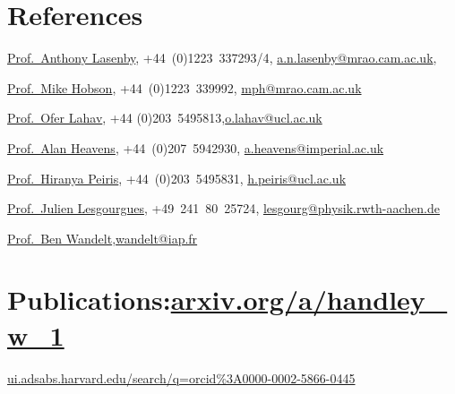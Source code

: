 \documentclass[11pt,a4paper,sans]{moderncv}
\begin{document}
\section{References}
\href{https://www.kicc.cam.ac.uk/directory/anl1000}{Prof.\ Anthony Lasenby}, {+44~(0)1223~337293/4}, \href{mailto:a.n.lasenby@mrao.cam.ac.uk}{a.n.lasenby@mrao.cam.ac.uk}, 

\href{https://www.phy.cam.ac.uk/directory/hobsonm}{Prof.\ Mike Hobson}, {+44~(0)1223~339992}, \href{mailto:mph@mrao.cam.ac.uk}{mph@mrao.cam.ac.uk} 


\href{https://www.ucl.ac.uk/astrophysics/professor-ofer-lahav}{Prof.\ Ofer Lahav}, {+44 (0)203~5495813},\href{mailto:o.lahav@ucl.ac.uk}{o.lahav@ucl.ac.uk} 

\href{https://www.imperial.ac.uk/people/a.heavens}{Prof.\ Alan Heavens}, {+44~(0)207~5942930}, \href{mailto:a.heavens@imperial.ac.uk}{a.heavens@imperial.ac.uk} 


\href{https://www.ucl.ac.uk/cosmoparticle/hiranya-peiris}{Prof.\ Hiranya Peiris}, {+44~(0)203~5495831}, \href{mailto:h.peiris@ucl.ac.uk}{h.peiris@ucl.ac.uk} 

\href{https://www.particle-theory.rwth-aachen.de/go/id/gufe/lidx/1}{Prof.\ Julien Lesgourgues}, {+49~241~80~25724}, \href{mailto:lesgourg@physik.rwth-aachen.de}{lesgourg@physik.rwth-aachen.de} 

\href{https://benwandelt.org/}{Prof.\ Ben Wandelt},\href{mailto:wandelt@iap.fr}{wandelt@iap.fr} 

\pagebreak
\section{Publications:\hfill  \href{https://www.arxiv.org/a/handley_w_1.html}{arxiv.org/a/handley\_w\_1}}

\hfill \href{https://ui.adsabs.harvard.edu/search/q=orcid\%3A0000-0002-5866-0445}{ui.adsabs.harvard.edu/search/q=orcid\%3A0000-0002-5866-0445}

\vspace{-10pt}

{\small
}
\end{document}
